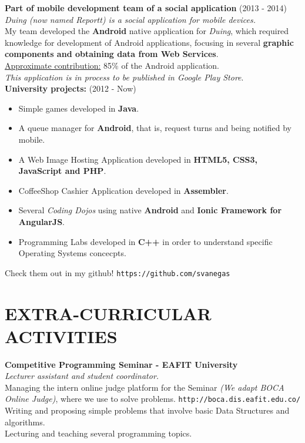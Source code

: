\documentclass[margin, 10pt]{res} %
\begin{document}
\begin{resume}
\textbf{Part of mobile development team of a social application} \hfill (2013 - 2014)\\
\textit{{\sl Duing} (now named {\sl Reportt}) is a social application for mobile devices.}\\
My team developed the \textbf{Android} native application for {\sl Duing}, which required knowledge
for development of Android applications, focusing in several \textbf{graphic components and
obtaining data from Web Services}.\\
\underline{Approximate contribution:} 85\% of the Android application. \\
\emph{This application is in process to be published in Google Play Store}.\\
\textbf{University projects:} \hfill (2012 - Now)
\begin{itemize}
  \item Simple games developed in \textbf{Java}.
  \item A queue manager for \textbf{Android}, that is, request turns and being notified by mobile.
  \item A Web Image Hosting Application developed in \textbf{HTML5, CSS3, JavaScript and PHP}.
  \item CoffeeShop Cashier Application developed in \textbf{Assembler}.
  \item Several \textit{Coding Dojos} using native \textbf{Android} and \textbf{Ionic Framework for
        AngularJS}.
  \item Programming Labs developed in \textbf{C++} in order to understand specific Operating Systems
        concecpts.
\end{itemize}
Check them out in my github! \texttt{https://github.com/svanegas}


\section{EXTRA-CURRICULAR \\ ACTIVITIES}
\textbf{Competitive Programming Seminar - EAFIT University} \\
\textit{Lecturer assistant and student coordinator.} \\
Managing the intern online judge platform for the Seminar {\sl (We adapt BOCA Online Judge)},
where we use to solve problems. \texttt{http://boca.dis.eafit.edu.co/} \\
Writing and proposing simple problems that involve basic Data Structures and algorithms. \\
Lecturing and teaching several programming topics. \\


\end{resume}
\end{document}
